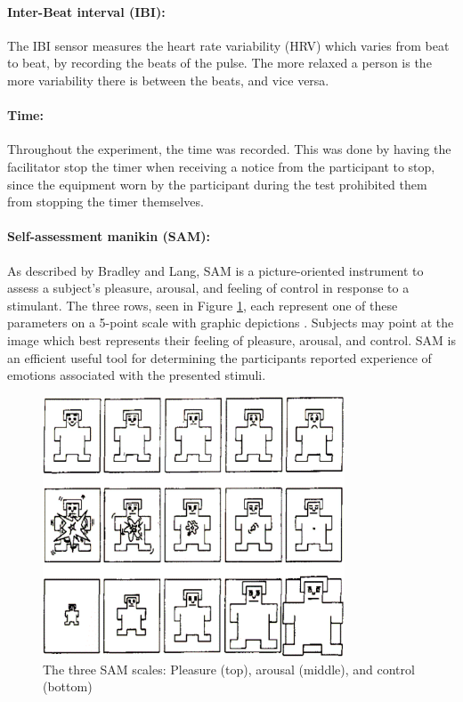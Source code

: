 \paragraph{Inter-Beat interval (IBI):} The IBI sensor measures the heart rate variability (HRV) which varies from beat to beat, by recording the beats of the pulse. The more relaxed a person is the more variability there is between the beats, and vice versa. 
\paragraph{Time:} Throughout the experiment, the time was recorded. This was done by having the facilitator stop the timer when receiving a notice from the participant to stop, since the equipment worn by the participant during the test prohibited them from stopping the timer themselves.
\paragraph{Self-assessment manikin (SAM):} As described by Bradley and Lang, SAM is a picture-oriented instrument to assess a subject’s pleasure, arousal, and feeling of control in response to a stimulant. The three rows, seen in Figure \ref{fig:SAM}, each represent one of these parameters on a 5-point scale with graphic depictions \cite{Bradley1994}. Subjects may point at the image which best represents their feeling of pleasure, arousal, and control. SAM is an efficient useful tool for determining the participants reported experience of emotions associated with the presented stimuli. 

\begin{figure}[h!]
    \centering
    \includegraphics[width=0.8\textwidth]{figures/SAM.png}
    \caption{The three SAM scales: Pleasure (top), arousal (middle), and control (bottom) \cite{Bradley1994}}\label{fig:SAM}
\end{figure}

